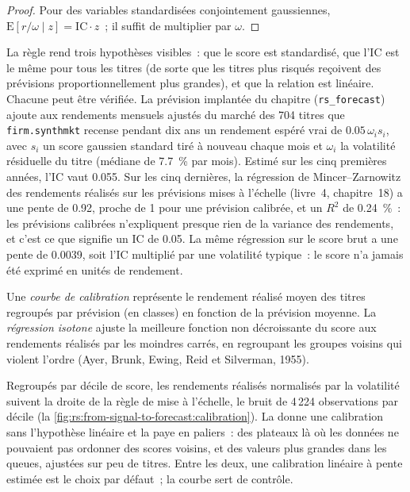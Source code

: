 \begin{proof}
Pour des variables standardisées conjointement gaussiennes, $\mathrm{E}[r/\omega \mid z] = \mathrm{IC}\cdot z$~; il suffit de multiplier par $\omega$.
\end{proof}

La règle rend trois hypothèses visibles~: que le score est standardisé, que l'IC est le même pour tous les titres (de sorte que les titres plus risqués
reçoivent des prévisions proportionnellement plus grandes), et que la relation est linéaire. Chacune peut être vérifiée. La prévision implantée du chapitre
(\texttt{rs\_forecast}) ajoute aux rendements mensuels ajustés du marché des 704 titres que \texttt{firm.synthmkt} recense pendant dix ans un
rendement espéré vrai de $0.05\,\omega_i s_i$, avec $s_i$ un score gaussien standard tiré à nouveau chaque mois et $\omega_i$ la volatilité résiduelle du titre
(médiane de 7.7~\% par mois). Estimé sur les cinq premières années, l'IC vaut 0.055. Sur les cinq dernières, la régression de Mincer--Zarnowitz des rendements réalisés
sur les prévisions mises à l'échelle (livre~4, chapitre~18) a une pente de 0.92, proche de 1 pour une prévision calibrée, et un $R^2$ de
0.24~\%~: les prévisions calibrées n'expliquent presque rien de la variance des rendements, et c'est ce que signifie un IC de 0.05. La même régression sur le
score brut a une pente de 0.0039, soit l'IC multiplié par une volatilité typique~: le score n'a jamais été exprimé en unités de rendement.

\begin{definition}\label{def:rs:from-signal-to-forecast:curve}
Une \emph{courbe de calibration} représente le rendement réalisé moyen des titres regroupés par prévision (en classes) en fonction de la
prévision moyenne. La \emph{régression isotone} ajuste la meilleure fonction non décroissante du score aux rendements réalisés par les
moindres carrés, en regroupant les groupes voisins qui violent l'ordre (Ayer, Brunk, Ewing, Reid et Silverman, 1955).
\end{definition}

Regroupés par décile de score, les rendements réalisés normalisés par la volatilité suivent la droite de la règle de mise à l'échelle, le bruit de 4\,224 observations par décile
(la \cref{fig:rs:from-signal-to-forecast:calibration}). La  donne une calibration sans l'hypothèse linéaire et la paye en
paliers~: des plateaux là où les données ne pouvaient pas ordonner des scores voisins, et des valeurs plus grandes dans les queues, ajustées sur peu de titres.
Entre les deux, une calibration linéaire à pente estimée est le choix par défaut~; la courbe sert de contrôle.


